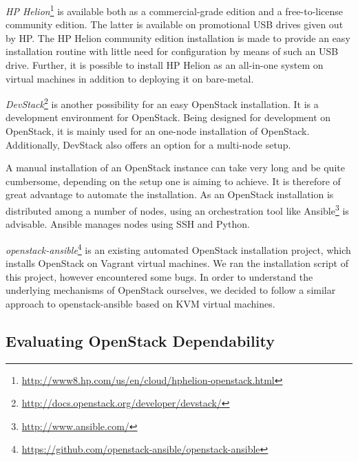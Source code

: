 \documentclass[conference]{IEEEtran}
\begin{document}
\emph{HP Helion}\footnote{\url{http://www8.hp.com/us/en/cloud/hphelion-openstack.html}} is available both as a commercial-grade edition and a free-to-license community edition. The latter is available on promotional USB drives given out by HP. The HP Helion community edition installation is made to provide an easy installation routine with little need for configuration by means of such an USB drive. Further, it is possible to install HP Helion as an all-in-one system on virtual machines in addition to deploying it on bare-metal. 

\emph{DevStack}\footnote{\url{http://docs.openstack.org/developer/devstack/}} is another possibility for an easy OpenStack installation. It is a development environment for OpenStack. Being designed for development on OpenStack, it is mainly used for an one-node installation of OpenStack. Additionally, DevStack also offers an option for a multi-node setup.

A manual installation of an OpenStack instance can take very long and be quite cumbersome, depending on the setup one is aiming to achieve. It is therefore of great advantage to automate the installation. As an OpenStack installation is distributed among a number of nodes, using an orchestration tool like Ansible\footnote{\url{http://www.ansible.com/}} is advisable. Ansible manages nodes using SSH and Python. 

\emph{openstack-ansible}\footnote{\url{https://github.com/openstack-ansible/openstack-ansible}} is an existing automated OpenStack installation project, which installs OpenStack on Vagrant virtual machines. We ran the installation script of this project, however encountered some bugs. In order to understand the underlying mechanisms of OpenStack ourselves, we decided to follow a similar approach to openstack-ansible based on KVM virtual machines.


\subsection{Evaluating OpenStack Dependability}
\end{document}
